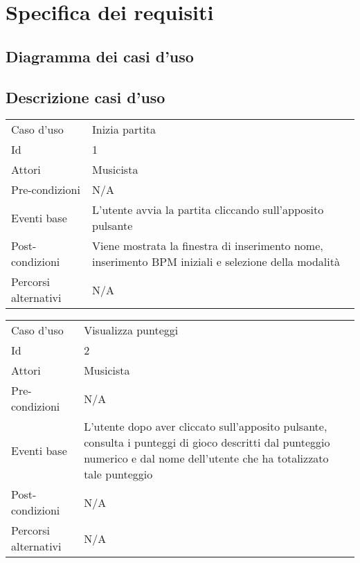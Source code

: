\section{Specifica dei requisiti}
      \subsection{Diagramma dei casi d'uso}  
        \vspace{1cm}
        
        \newpage
        \subsection{Descrizione casi d'uso}
            \begin{center}
                \vspace{1cm}
                \begin{tabular}{ m{10em} | m{20em} }
                    Caso d'uso & Inizia partita \\
                    Id & 1 \\
                    Attori & Musicista \\
                    Pre-condizioni & N/A \\
                    Eventi base & L'utente avvia la partita cliccando sull'apposito pulsante \\
                    Post-condizioni & Viene mostrata la finestra di inserimento nome, inserimento BPM iniziali e selezione della modalità \\
                    Percorsi alternativi & N/A \\
                \end{tabular}
                
                \vspace{2cm}
                \begin{tabular}{ m{10em} | m{20em} }
                    Caso d'uso & Visualizza punteggi \\
                    Id & 2 \\
                    Attori & Musicista \\
                    Pre-condizioni & N/A \\
                    Eventi base & L'utente dopo aver cliccato sull'apposito pulsante, consulta i punteggi di gioco descritti dal punteggio numerico e dal nome dell'utente che ha totalizzato tale punteggio  \\
                    Post-condizioni & N/A \\
                    Percorsi alternativi & N/A \\
                \end{tabular}
                

\end{center}
